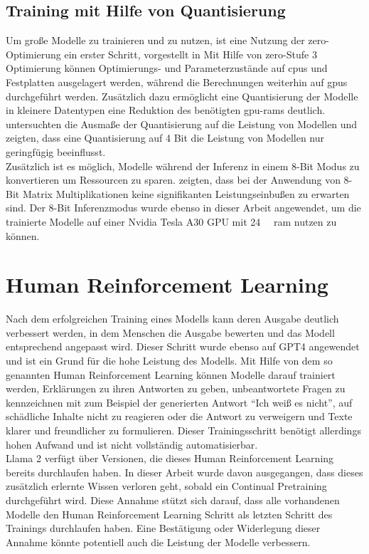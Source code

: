 \subsection{Training mit Hilfe von Quantisierung}
Um große Modelle zu trainieren und zu nutzen, ist eine Nutzung der \ac{zero}-Optimierung ein erster Schritt, vorgestellt in \citet{zero}
Mit Hilfe von \ac{zero}-Stufe 3 Optimierung können Optimierungs- und Parameterzustände auf \ac{cpu}s und Festplatten ausgelagert werden, während die Berechnungen weiterhin auf \ac{gpu}s durchgeführt werden.
Zusätzlich dazu ermöglicht eine Quantisierung der Modelle in kleinere Datentypen eine Reduktion des benötigten \ac{gpu}-\ac{ram}s deutlich.
\citet{4bit} untersuchten die Ausmaße der Quantisierung auf die Leistung von Modellen und zeigten, dass eine Quantisierung auf 4 Bit die Leistung von Modellen nur geringfügig beeinflusst.\\

Zusätzlich ist es möglich, Modelle während der Inferenz in einem 8-Bit Modus zu konvertieren um Ressourcen zu sparen.
\citet{8bit-inference} zeigten, dass bei der Anwendung von 8-Bit Matrix Multiplikationen keine signifikanten Leistungseinbußen zu erwarten sind.
Der 8-Bit Inferenzmodus wurde ebenso in dieser Arbeit angewendet, um die trainierte Modelle auf einer Nvidia Tesla A30 GPU mit \SI{24}{\giga\byte} \ac{ram} nutzen zu können.\\

\section{Human Reinforcement Learning}
Nach dem erfolgreichen Training eines Modells kann deren Ausgabe deutlich verbessert werden, in dem Menschen die Ausgabe bewerten und das Modell entsprechend angepasst wird.
Dieser Schritt wurde ebenso auf GPT4 angewendet und ist ein Grund für die hohe Leistung des Modells.
Mit Hilfe von dem so genannten Human Reinforcement Learning können Modelle darauf trainiert werden, Erklärungen zu ihren Antworten zu geben, unbeantwortete Fragen zu kennzeichnen mit zum Beispiel der generierten Antwort \enquote{Ich weiß es nicht}, auf schädliche Inhalte nicht zu reagieren oder die Antwort zu verweigern und Texte klarer und freundlicher zu formulieren.
Dieser Trainingsschritt benötigt allerdings hohen Aufwand und ist nicht vollständig automatisierbar.\\

Llama 2 verfügt über Versionen, die dieses Human Reinforcement Learning bereits durchlaufen haben.
In dieser Arbeit wurde davon ausgegangen, dass dieses zusätzlich erlernte Wissen verloren geht, sobald ein Continual Pretraining durchgeführt wird.
Diese Annahme stützt sich darauf, dass alle vorhandenen Modelle den Human Reinforcement Learning Schritt als letzten Schritt des Trainings durchlaufen haben.
Eine Bestätigung oder Widerlegung dieser Annahme könnte potentiell auch die Leistung der Modelle verbessern.\\

